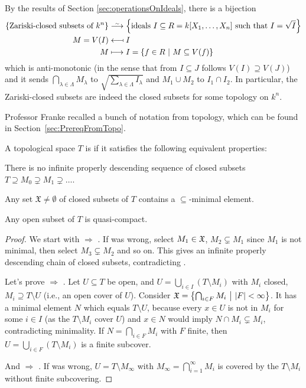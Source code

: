 \documentclass[a4paper,parskip=half,numbers=enddot, DIV=12]{scrreprt}
\begin{document}
	\begin{rem}
		By the results of Section \ref{sec:operationsOnIdeals}, there is a bijection%
		\begin{align*}
		\left\{\text{Zariski-closed subsets of }k^n\right\}&\isomorphism\left\{\text{ideals }I\subseteq R=k[X_1,\ldots,X_n]\text{ such that }I=\sqrt I\right\}\\
		M=V(I) &\longmapsfrom I\\
		M&\longmapsto I = \left\{f\in R\st M\subseteq V(f)\right\}
		\end{align*}
		which is anti-monotonic (in the sense that from $I\subseteq J$ follows $V(I)\supseteq V(J)$) and it sends $\bigcap_{\lambda\in\Lambda} M_\lambda$ to $\sqrt{\sum_{\lambda\in\Lambda}I_\lambda}$ and $M_1\cup M_2$ to $I_1\cap I_2$. In particular, the Zariski-closed subsets are indeed the closed subsets for some topology on $k^n$.
	\end{rem}
	Professor Franke recalled a bunch of notation from topology, which can be found in Section~\ref{sec:PrereqFromTopo}.
	\begin{defi}
		A topological space $T$ is  if it satisfies the following equivalent properties:
		\begin{alphanumerate}
			\item There is no infinite properly descending sequence of closed subsets $T\supseteq M_0 \supsetneq M_1 \supsetneq\ldots $.
			\item Any set $\mathfrak{X}\neq \emptyset$ of closed subsets of $T$ contains a $\subseteq$-minimal element.
			\item Any open subset of $T$ is quasi-compact.
		\end{alphanumerate}
	\end{defi}
	\begin{proof}
		We start with  $\Rightarrow$ . If  was wrong, select $M_1\in \mathfrak{X}$, $M_2\subsetneq M_1$ since $M_1$ is not minimal, then select $M_3\subsetneq M_2$ and so on. This gives an infinite properly descending chain of closed subsets, contradicting .
		
		Let's prove  $\Rightarrow$ . Let $U\subseteq T$ be open, and $U = \bigcup_{i\in I}(T\setminus M_i)$ with $M_i$ closed, $M_i\supseteq T\setminus U$ (i.e., an open cover of $U$). Consider $\mathfrak{X} = \left\{\bigcap_{i\in F} M_i\ \middle|\  |F|<\infty\right\}$. It has a minimal element $N$ which equals $T\setminus U$, because every $x\in U$ is not in $M_i$ for some $i\in I$ (as the $T\setminus M_i$ cover $U$) and $x\in N$ would imply $N\cap M_i\subsetneq M_i$, contradicting minimality. If $N= \bigcap_{i \in F}M_i$ with $F$ finite, then $U= \bigcup_{i \in F} (T\setminus M_i)$ is a finite subcover.
		
		And  $\Rightarrow$ . If  was wrong, $U = T\setminus M_\infty$ with $M_\infty = \bigcap_{i=1}^\infty M_i$ is covered by the $T\setminus M_i$ without finite subcovering.
	\end{proof}
\end{document}
